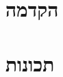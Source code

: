 \documentclass[]{article}
\def\insert#1{}
\begin{document}
\def\lecnum{7}
\def\topcis{
מסלולים קלים ביותר - אלגוריתם גנרי
}

\section*{הקדמה}
\insert{intro}
\section*{תכונות}
\insert{properties}
\end{document}

